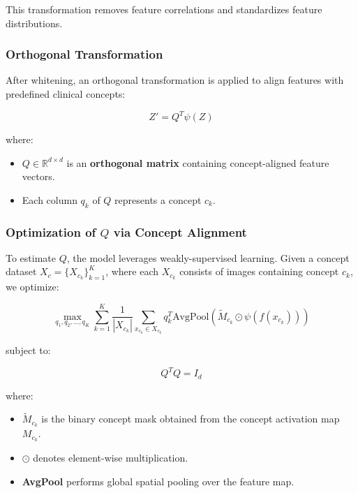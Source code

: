 \documentclass[a4paper,11pt]{article}
\begin{document}
This transformation removes feature correlations and standardizes feature distributions.

\subsubsection{Orthogonal Transformation}
After whitening, an orthogonal transformation is applied to align features with predefined clinical concepts:

\begin{equation}
    Z' = Q^T \psi(Z)
\end{equation}

where:
\begin{itemize}
    \item \( Q \in \mathbb{R}^{d \times d} \) is an \textbf{orthogonal matrix} containing concept-aligned feature vectors.
    \item Each column \( q_k \) of \( Q \) represents a concept \( c_k \).
\end{itemize}

\subsubsection{Optimization of \( Q \) via Concept Alignment}
To estimate \( Q \), the model leverages weakly-supervised learning. Given a concept dataset \( X_c = \{ X_{c_k} \}_{k=1}^{K} \), where each \( X_{c_k} \) consists of images containing concept \( c_k \), we optimize:

\begin{equation}
    \max_{q_1, q_2, ..., q_K} \sum_{k=1}^{K} \frac{1}{|X_{c_k}|} \sum_{x_{c_k} \in X_{c_k}} q_k^T \text{AvgPool}( \tilde{M}_{c_k} \odot \psi(f(x_{c_k})) )
\end{equation}

subject to:

\begin{equation}
    Q^T Q = I_d
\end{equation}

where:
\begin{itemize}
    \item \( \tilde{M}_{c_k} \) is the binary concept mask obtained from the concept activation map \( M_{c_k} \).
    \item \( \odot \) denotes element-wise multiplication.
    \item \textbf{AvgPool} performs global spatial pooling over the feature map.
\end{itemize}
\end{document}
